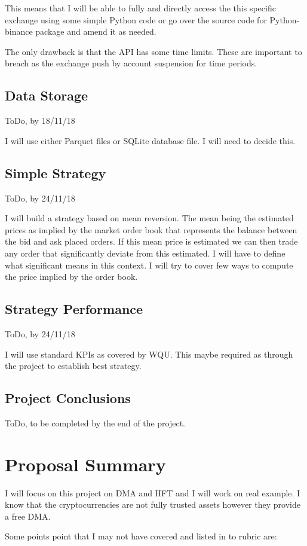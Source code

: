 \documentclass[12pt]{article}
\begin{document}
This means that I will be able to fully and directly access the this specific exchange using some simple Python code or go over the source code for Python-binance package and amend it as needed.

The only drawback is that the API has some time limits. These are important to breach as the exchange push by account suspension for time periods.
 
\subsection{Data Storage}
ToDo, by 18/11/18

I will use either Parquet files or SQLite database file. I will need to decide this.
\subsection{Simple Strategy}
ToDo, by 24/11/18

I will build a strategy based on mean reversion. The mean being the estimated prices as implied by the market order book that represents the balance between the bid and ask placed orders. If this mean price is estimated we can then trade any order that significantly deviate from this estimated. I will have to define what significant means in this context. I will try to cover few ways to compute the price implied by the order book.
\subsection{Strategy Performance}
ToDo, by 24/11/18

I will use standard KPIs as covered by WQU. This maybe required as through the project to establish best strategy.
\subsection{Project Conclusions}
ToDo, to be completed by the end of the project. 

\section{Proposal Summary}
I will focus on this project on DMA and HFT and I will work on real example. I know that the cryptocurrencies are not fully trusted assets however they provide a free DMA.

Some points point that I may not have covered and listed in to rubric are:
\end{document}
